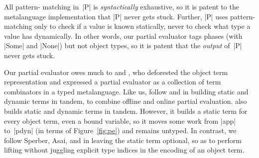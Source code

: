 All pattern\hyp
matching in~|P| is \emph{syntactically} exhaustive, so it is patent to the
metalanguage implementation that |P| never gets stuck.  Further,
|P| uses pattern\hyp matching
only to check if a value is known statically,
never to check what type a value has dynamically.
In other words, our partial evaluator tags
phases (with |Some| and |None|) but not object types, so it
is patent that the \emph{output} of~|P| never gets stuck.

Our partial evaluator owes much to
\citet{Thiemann-combinators} and \citet{sumii-hybrid}, who deforested
the object term representation and expressed a partial evaluator as a collection
of term combinators in a typed metalanguage.  Like us, \citeauthor{sumii-hybrid}
follow \citet{Sperber-SelfApplicable} and \citet{asai-binding-time} in building
static and dynamic terms in tandem, to combine offline and online partial
evaluation.
 also
builds static and dynamic terms in tandem.  However, it
builds a static term for every object term, even a bound variable,
so it moves some work from |app| to~|pdyn| (in terms of Figure~\ref{fig:pe})
and remains untyped.  In contrast, we follow Sperber, Asai,
and \citeauthor{sumii-hybrid} in leaving the static term
optional, so as to perform lifting without
juggling explicit type indices in the encoding of an object term.


